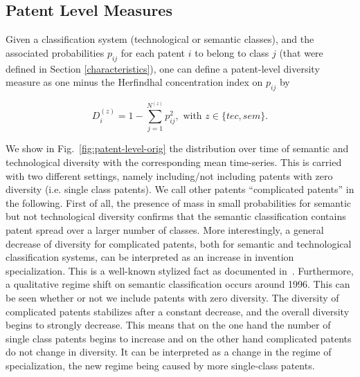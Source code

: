 \documentclass[10pt,A4,draft]{article}
\begin{document}

\subsection{Patent Level Measures}  \label{subsec:orig-gene}

Given a classification system (technological or semantic classes), and the associated probabilities $p_{ij}$ for each patent $i$ to belong to class $j$ (that were defined in Section \ref{characteristics}), one can define a patent-level diversity measure as one minus the Herfindhal concentration index on $p_{ij}$  by

\[
D_i^{(z)} = 1 - \sum_{j =1}^{N^{(z)}} {p_{ij}^2}, \text{ with } z \in \{tec, sem\}.
\]

We show in Fig.~\ref{fig:patent-level-orig} the distribution over time of semantic and technological diversity with the corresponding mean time-series. This is carried with two different settings, namely including/not including patents with zero diversity (i.e. single class patents). We call other patents ``complicated patents'' in the following. First of all, the presence of mass in small probabilities for semantic but not technological diversity confirms that the semantic classification contains patent spread over a larger number of classes. More interestingly, a general decrease of diversity for complicated patents, both for semantic and technological classification systems, can be interpreted as an increase in invention specialization. This is a well-known stylized fact as documented in~\cite{ARCHIBUGI199279}. Furthermore, a qualitative regime shift on semantic classification occurs around 1996. This can be seen whether or not we include patents with zero diversity. The diversity of complicated patents stabilizes after a constant decrease, and the overall diversity begins to strongly decrease. This means that on the one hand the number of single class patents begins to increase and on the other hand complicated patents do not change in diversity. It can be interpreted as a change in the regime of specialization, the new regime being caused by more single-class patents.
\end{document}
